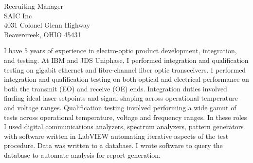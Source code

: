 \documentclass{letter} %
\newcommand{\contactperson}{Recruiting Manager}
\newcommand{\contactCompany}{SAIC Inc}
\newcommand{\contactStreetAddress}{4031 Colonel Glenn Highway}
\newcommand{\contactCityStateZip}{Beavercreek, OHIO 45431 }
\begin{document}
\begin{letter}{\contactperson \\
\contactCompany \\
\contactStreetAddress \\
\contactCityStateZip

}
\noindent
I have 5 years of experience in electro-optic product development, integration, and testing.
At IBM and JDS Uniphase, I performed integration and qualification testing on gigabit ethernet and fibre-channel fiber optic transceivers.  I performed integration and qualification testing on both optical and electrical performance on both the transmit (EO) and receive (OE) ends. Integration duties involved finding ideal laser setpoints and signal shaping across operational temperature and voltage ranges. 
Qualification testing involved performing a wide gamut of tests across operational temperature, voltage and frequency ranges. In these roles I used digital communications analyzers, spectrum analyzers, pattern generators with software written in LabVIEW automating iterative aspects of the test procedure. Data was written to a database. I wrote software to query the database to automate analysis for report generation.


\end{letter}
\end{document}
